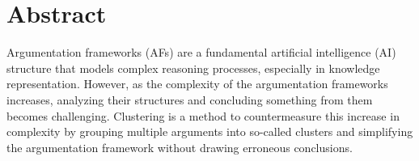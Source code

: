 \documentclass[twoside,openright]{scrreprt}
\begin{document}






\thesisdate[ ]{\today}







\printthesistitle

% 


\chapter*{Abstract}
Argumentation frameworks (AFs) are a fundamental artificial intelligence (AI) structure that models complex reasoning processes, especially in knowledge representation. However, as the complexity of the argumentation frameworks increases, analyzing their structures and concluding something from them becomes challenging. Clustering is a method to countermeasure this increase in complexity by grouping multiple arguments into so-called clusters and simplifying the argumentation framework without drawing erroneous conclusions.
\end{document}
